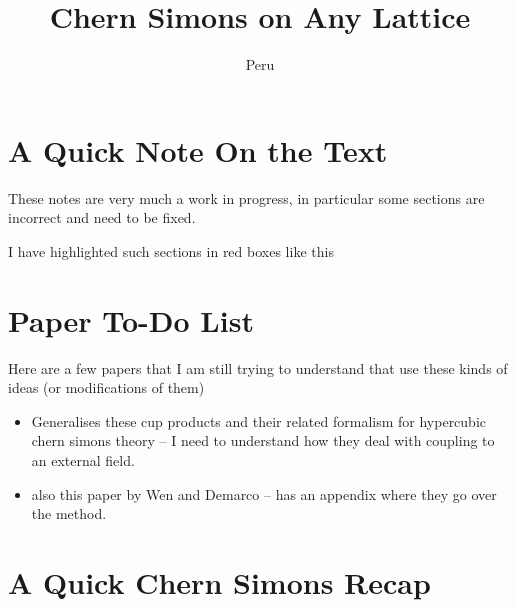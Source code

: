 \documentclass[11pt, oneside]{article} %
\title{\textbf{Chern Simons on Any Lattice}}
\author{Peru}
\date{}
\numberwithin{equation}{section}
\begin{document}
\maketitle

\tableofcontents

\section*{A Quick Note On the Text}

These notes are very much a work in progress, in particular some sections are incorrect and need to be fixed. 

\begin{incorrect}
I have highlighted such sections in red boxes like this
\end{incorrect}

\section{Paper To-Do List}
Here are a few papers that I am still trying to understand that use these kinds of ideas (or modifications of them)
\begin{itemize}
    \item \cite{jacobson_modified_2023} Generalises these cup products and their related formalism for hypercubic chern simons theory -- I need to understand how they deal with coupling to an external field.
    \item \cite{demarco_compact_2021} also this paper by Wen and Demarco -- has an appendix where they go over the method.
\end{itemize}
    

\section{A Quick Chern Simons Recap}
\end{document}
